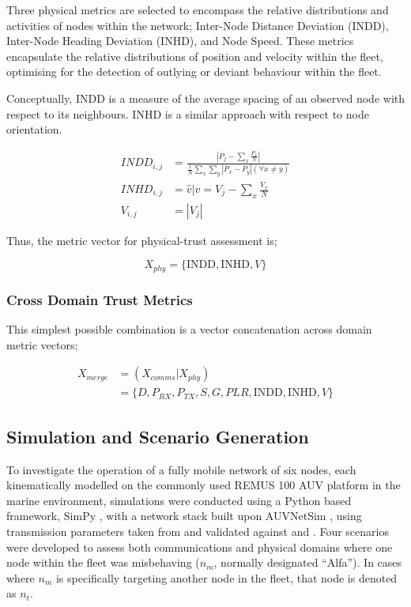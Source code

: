 \documentclass[conference]{IEEEtran}
\begin{document}
Three physical metrics are selected to encompass the relative distributions and activities of nodes within the network; Inter-Node Distance Deviation (INDD), Inter-Node Heading Deviation (INHD), and Node Speed. These metrics encapsulate the relative distributions of position and velocity within the fleet, optimising for the detection of outlying or deviant behaviour within the fleet.

Conceptually, INDD is a measure of the average spacing of an observed node with respect to its neighbours. INHD is a similar approach with respect to node orientation.

\begin{align}
	INDD_{i,j} &= \frac{|P_j - \sum_x \frac{P_x}{N}|}{\frac{1}{N}\sum_x \sum_y{|P_x - P_y| (\forall x \neq y)}}\\
	INHD_{i,j} &= \hat{v} \vert v= V_j - \sum_x{\frac{V_x}{N}}\\
	V_{i,j} &= |V_j|
\end{align}

Thus, the metric vector for physical-trust assessment is;

\begin{equation}
  X_{phy}=\{\text{INDD}, \text{INHD}, V\}
	\label{eq:phys:vector}
\end{equation}

\subsubsection{Cross Domain Trust Metrics}
This simplest possible combination is a vector concatenation across domain metric vectors; 

\begin{align}
  X_{merge} &=  (X_{comms}|X_{phy}) \\
  &= \{D, P_{RX}, P_{TX}, S, G, PLR, \text{INDD}, \text{INHD}, V\}
  \label{eq:phys:vector}
\end{align}


\subsection{Simulation and Scenario Generation}
To investigate the operation of a fully mobile network of six nodes, each kinematically modelled on the commonly used REMUS 100 AUV platform \cite{Milgram2001} in the marine environment, simulations were conducted using a Python based framework, SimPy \cite{Mueller2003SimPy}, with a network stack built upon AUVNetSim \cite{Miquel2008}, using transmission parameters taken from and validated against \cite{Stojanovic2007} and \cite{Stefanov2011}.
Four scenarios were developed to assess both communications and physical domains where one node within the fleet was misbehaving ($n_m$, normally designated ``Alfa''). In cases where $n_m$ is specifically targeting another node in the fleet, that node is denoted as $n_t$.
\end{document}
